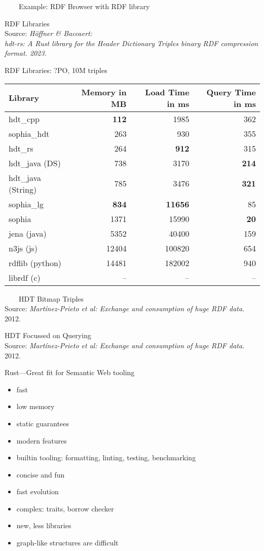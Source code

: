 \documentclass[14pt,aspectratio=169]{beamer}
\newcommand{\imageslide}[4][]
{
\begin{frame}[plain]{~~~~#2}
\vspace{0.2em}
\centering\makebox[\linewidth]{\texttt{[image: \#3]}}
\\#1
\note{#4}
\end{frame}
}
\newcommand\pro{\item[$+$]}
\newcommand\con{\item[$-$]}
\begin{document}
\imageslide{Example: RDF Browser with RDF library}{img/architecture-simple.pdf}{}

\begin{frame}[plain]{RDF Libraries}
\centering
{}\\
\scriptsize Source: \emph{Höffner \& Baccaert:\\hdt-rs: A Rust library for the Header Dictionary Triples binary RDF compression format. 2023.}
\end{frame}

\begin{frame}[fragile]{RDF Libraries: ?PO, 10M triples}
\centering
\small
\begin{tabular}{lrrr}
\toprule
Library & Memory in MB & Load Time in ms & Query Time in ms \\
\midrule
hdt\_cpp & \textbf{112} & 1985 & 362 \\
sophia\_hdt & 263 & 930 & 355 \\
hdt\_rs & 264 & \textbf{912} & 315 \\
hdt\_java (DS) & 738 & 3170 & \textbf{214} \\
hdt\_java (String) & 785 & 3476 & \textbf{321} \\
\midrule
sophia\_lg & \textbf{834} & \textbf{11656} & 85 \\
sophia & 1371 & 15990 & \textbf{20} \\
jena (java) & 5352 & 40400 & 159 \\
n3js (js) & 12404 & 100820 & 654 \\
rdflib (python) & 14481 & 182002 & 940 \\
librdf (c) & -- & -- & -- \\
\bottomrule
\end{tabular}
\end{frame}

\imageslide[\footnotesize Source: \emph{Martínez-Prieto et al: Exchange and consumption of huge RDF data.} 2012.]{HDT Bitmap Triples}{img/bt.png}{}

\begin{frame}[plain]{HDT Focussed on Querying}
\centering
{}\\
\footnotesize Source: \emph{Martínez-Prieto et al: Exchange and consumption of huge RDF data.} 2012.
\end{frame}

\begin{frame}{Rust---Great fit for Semantic Web tooling}
\begin{itemize}
\pro fast
\pro low memory
\pro static guarantees
\pro modern features
\pro builtin tooling: formatting, linting, testing, benchmarking
\pro concise and fun
\pro fast evolution
\pause
\con complex: traits, borrow checker
\con new, less libraries
\con graph-like structures are difficult
\end{itemize}
\end{frame}
\end{document}

